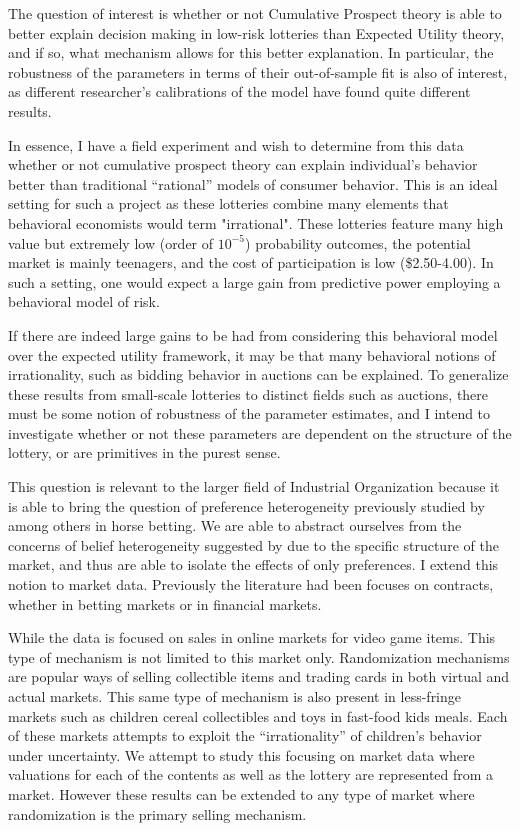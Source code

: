 \documentclass[12pt]{paper}
\begin{document}
The question of interest is whether or not Cumulative Prospect theory
is able to better explain decision making in low-risk lotteries than
Expected Utility theory, and if so, what mechanism allows for this
better explanation. In particular, the robustness of the parameters in
terms of their out-of-sample fit is also of interest, as different
researcher's calibrations of the model have found quite different
results. 

In essence, I have a field experiment and wish to determine from this
data whether or not cumulative prospect theory can explain
individual's behavior better than traditional ``rational'' models of
consumer behavior. This is an ideal setting for such a project as
these lotteries combine many elements that behavioral economists would
term "irrational". These lotteries feature many high value but
extremely low (order of $10^{-5}$) probability outcomes, the potential
market is mainly teenagers, and the cost of participation is low
(\$2.50-4.00). In such a setting, one would expect a large gain from
predictive power employing a behavioral model of risk.

If there are indeed large gains to be had from considering this
behavioral model over the expected utility framework, it may be that
many behavioral notions of irrationality, such as bidding behavior in
auctions can be explained. To generalize these results from
small-scale lotteries to distinct fields such as auctions, there must
be some notion of robustness of the parameter estimates, and I intend
to investigate whether or not these parameters are dependent on the
structure of the lottery, or are primitives in the purest sense. 

This question is relevant to the larger field of Industrial
Organization because it is able to bring the question of preference
heterogeneity previously studied by \cite{Snowberg2010} among others
in horse betting. We are able to abstract ourselves from the concerns
of belief heterogeneity suggested by \cite{Gandhi2014} due to the
specific structure of the market, and thus are able to isolate the
effects of only preferences. I extend this notion to market
data. Previously the literature had been focuses on contracts, whether
in betting markets or in financial markets.

While the data is focused on sales in online markets for video game
items. This type of mechanism is not limited to this market
only. Randomization mechanisms are popular ways of selling collectible
items and trading cards in both virtual and actual markets. This same
type of mechanism is also present in less-fringe markets such as
children cereal collectibles and toys in fast-food kids meals. Each of
these markets attempts to exploit the ``irrationality'' of children's
behavior under uncertainty. We attempt to study this focusing on
market data where valuations for each of the contents as well as the
lottery are represented from a market. However these results can be
extended to any type of market where randomization is the primary
selling mechanism. 
\end{document}
